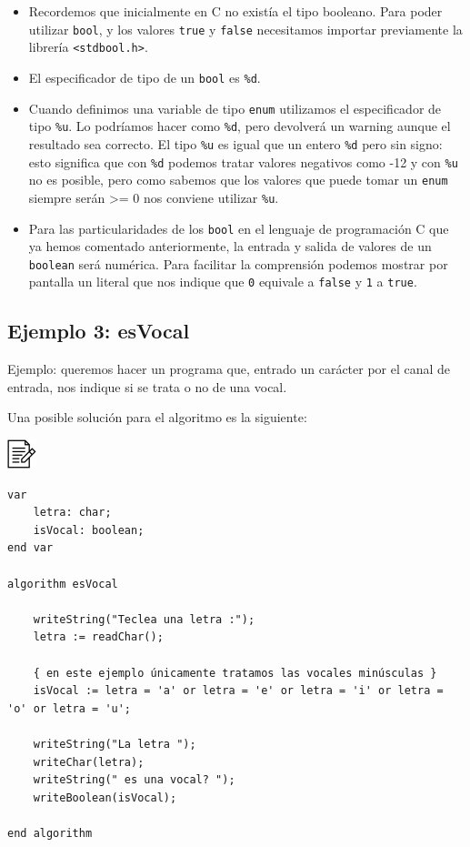 \documentclass[
]{book}
\providecommand{\tightlist}{%
  \setlength{\itemsep}{0pt}\setlength{\parskip}{0pt}}
\begin{document}
\begin{itemize}
\tightlist
\item
  Recordemos que inicialmente en C no existía el tipo booleano. Para poder utilizar \texttt{bool}, y los valores \texttt{true} y \texttt{false} necesitamos importar previamente la librería \texttt{\textless{}stdbool.h\textgreater{}}.
\item
  El especificador de tipo de un \texttt{bool} es \texttt{\%d}.
\item
  Cuando definimos una variable de tipo \texttt{enum} utilizamos el especificador de tipo \texttt{\%u}. Lo podríamos hacer como \texttt{\%d}, pero devolverá un warning aunque el resultado sea correcto. El tipo \texttt{\%u} es igual que un entero \texttt{\%d} pero sin signo: esto significa que con \texttt{\%d} podemos tratar valores negativos como -12 y con \texttt{\%u} no es posible, pero como sabemos que los valores que puede tomar un \texttt{enum} siempre serán \textgreater= 0 nos conviene utilizar \texttt{\%u}.
\item
  Para las particularidades de los \texttt{bool} en el lenguaje de programación C que ya hemos comentado anteriormente, la entrada y salida de valores de un \texttt{boolean} será numérica. Para facilitar la comprensión podemos mostrar por pantalla un literal que nos indique que \texttt{0} equivale a \texttt{false} y \texttt{1} a \texttt{true}.
\end{itemize}

\hypertarget{ejemplo-3-esvocal}{%
\subsection{Ejemplo 3: esVocal}\label{ejemplo-3-esvocal}}

Ejemplo: queremos hacer un programa que, entrado un carácter por el canal de entrada, nos indique si se trata o no de una vocal.

Una posible solución para el algoritmo es la siguiente:

\includegraphics{./img/alg.png}

\begin{verbatim}
var
    letra: char;
    isVocal: boolean;
end var

algorithm esVocal

    writeString("Teclea una letra :");
    letra := readChar();

    { en este ejemplo únicamente tratamos las vocales minúsculas }
    isVocal := letra = 'a' or letra = 'e' or letra = 'i' or letra = 'o' or letra = 'u';

    writeString("La letra ");
    writeChar(letra);
    writeString(" es una vocal? ");
    writeBoolean(isVocal);

end algorithm
\end{verbatim}
\end{document}
